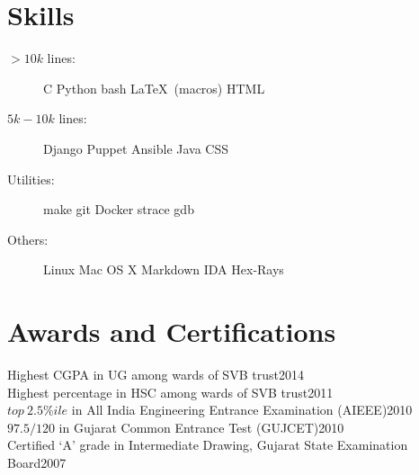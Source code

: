 \documentclass[margin]{res}
\begin{document}
\begin{resume}
\section{Skills}
\begin{description}
    \item[$>10k$ lines:]
        C \textbullet{}
        Python \textbullet{}
        bash \textbullet{}
        \LaTeX\ (macros) \textbullet{}
        HTML

    \item[$5k-10k$ lines:]
        Django \textbullet{}
        Puppet \textbullet{}
        Ansible \textbullet{}
        Java \textbullet{}
        CSS

    \item[Utilities:]
        make \textbullet{}
        git \textbullet{}
        Docker \textbullet{}
        strace \textbullet{}
        gdb

    \item[Others:]
        Linux \textbullet{}
        Mac OS X \textbullet{}
        Markdown \textbullet{}
        IDA Hex-Rays
\end{description}

\section{Awards and Certifications}
Highest CGPA in UG among wards of SVB trust\hfill 2014\\
Highest percentage in HSC among wards of SVB trust\hfill 2011\\
$top\ 2.5\%ile$ in All India Engineering Entrance Examination (AIEEE)\hfill 2010\\
$97.5 / 120$ in Gujarat Common Entrance Test (GUJCET)\hfill 2010\\
Certified `A' grade in Intermediate Drawing, Gujarat State Examination Board\hfill 2007\\


\end{resume} 
\end{document}
